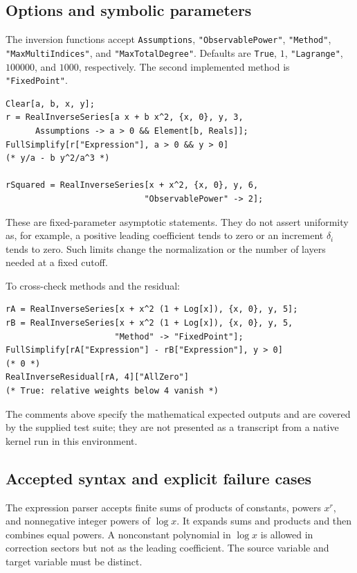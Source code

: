 \documentclass[11pt,a4paper]{article}
\numberwithin{equation}{section}
\theoremstyle{definition}\newtheorem{definition}[theorem]{Definition}
\theoremstyle{remark}\newtheorem{remark}[theorem]{Remark}
\newcommand{\code}[1]{\texttt{#1}}
\begin{document}
\subsection{Options and symbolic parameters}

{\raggedright
The inversion functions accept \code{Assumptions},
\code{"ObservablePower"}, \code{"Method"},
\code{"MaxMultiIndices"}, and \code{"MaxTotalDegree"}. Defaults are
\code{True}, $1$, \code{"Lagrange"}, $100000$, and $1000$, respectively.
The second implemented method is \code{"FixedPoint"}.\par}

\begin{lstlisting}
Clear[a, b, x, y];
r = RealInverseSeries[a x + b x^2, {x, 0}, y, 3,
      Assumptions -> a > 0 && Element[b, Reals]];
FullSimplify[r["Expression"], a > 0 && y > 0]
(* y/a - b y^2/a^3 *)

rSquared = RealInverseSeries[x + x^2, {x, 0}, y, 6,
                            "ObservablePower" -> 2];
\end{lstlisting}
These are fixed-parameter asymptotic statements. They do not assert
uniformity as, for example, a positive leading coefficient tends to zero
or an increment $\delta_i$ tends to zero. Such limits change the
normalization or the number of layers needed at a fixed cutoff.

To cross-check methods and the residual:
\begin{lstlisting}
rA = RealInverseSeries[x + x^2 (1 + Log[x]), {x, 0}, y, 5];
rB = RealInverseSeries[x + x^2 (1 + Log[x]), {x, 0}, y, 5,
                      "Method" -> "FixedPoint"];
FullSimplify[rA["Expression"] - rB["Expression"], y > 0]
(* 0 *)
RealInverseResidual[rA, 4]["AllZero"]
(* True: relative weights below 4 vanish *)
\end{lstlisting}
The comments above specify the mathematical expected outputs and are
covered by the supplied test suite; they are not presented as a transcript
from a native kernel run in this environment.

\subsection{Accepted syntax and explicit failure cases}

The expression parser accepts finite sums of products of constants,
powers $x^r$, and nonnegative integer powers of $\log x$. It expands sums
and products and then combines equal powers. A nonconstant polynomial in
$\log x$ is allowed in correction sectors but not as the leading
coefficient. The source variable and target variable must be distinct.
\end{document}
